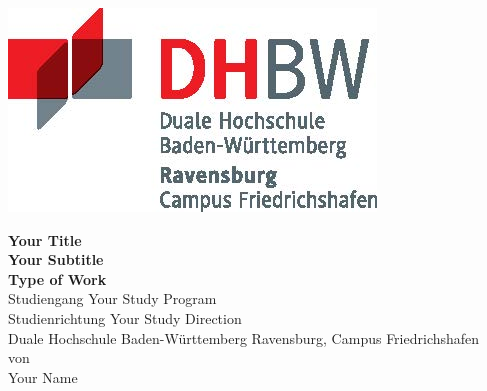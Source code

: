 \documentclass{scrbook} %
\newcommand{\titel}{Your Title}
\newcommand{\untertitel}{Your Subtitle}
\newcommand{\arbeit}{Type of Work}
\newcommand{\studiengang}{Your Study Program}
\newcommand{\studienrichtung}{Your Study Direction}
\newcommand{\autor}{Your Name}
\begin{document}
\thispagestyle{plain}
\hypersetup{pageanchor=false}
\begin{titlepage}
\enlargethispage{4.0cm}
\sffamily  %

\parbox{0.5\linewidth}{
\begin{flushleft}
\end{flushleft}
}
\parbox{0.5\linewidth}{
\begin{flushright}
    \includegraphics[width=0.4\linewidth]{images/DHBW_d_R_FN_46mm_4c}\\[5ex]
\end{flushright}
}

\begin{center}

{\fontsize{20.74pt}{24pt}\selectfont
\textbf{\titel}\\[1.5ex]}
{\fontsize{14pt}{17pt}\selectfont
\textbf{\untertitel}\\[5ex]}
{\fontsize{17pt}{20pt}\selectfont
\textbf{\arbeit}\\[2ex]}
{\fontsize{14pt}{17pt}\selectfont
Studiengang \studiengang\\[2ex]}
{\fontsize{12pt}{14pt}\selectfont
Studienrichtung \studienrichtung\\[1ex]
Duale Hochschule Baden-Württemberg Ravensburg, Campus Friedrichshafen\\[5ex]
von\\[1ex]
\autor\\[15ex]}

\end{center}


\end{titlepage}
\end{document}
